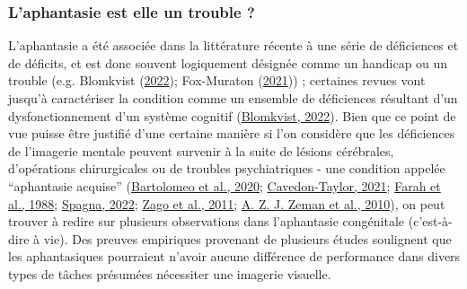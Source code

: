 \documentclass[
  12pt,
]{article}
\begin{document}
\hypertarget{laphantasie-est-elle-un-trouble}{%
\subsubsection{L'aphantasie est elle un trouble
?}\label{laphantasie-est-elle-un-trouble}}

L'aphantasie a été associée dans la littérature récente à une série de
déficiences et de déficits, et est donc souvent logiquement désignée
comme un handicap ou un trouble (e.g. Blomkvist
(\protect\hyperlink{ref-blomkvistAphantasiaSearchTheory2022}{2022});
Fox-Muraton
(\protect\hyperlink{ref-fox-muratonWorldImaginationConsequences2021}{2021}))
; certaines revues vont jusqu'à caractériser la condition comme un
ensemble de déficiences résultant d'un dysfonctionnement d'un système
cognitif
(\protect\hyperlink{ref-blomkvistAphantasiaSearchTheory2022}{Blomkvist,
2022}). Bien que ce point de vue puisse être justifié d'une certaine
manière si l'on considère que les déficiences de l'imagerie mentale
peuvent survenir à la suite de lésions cérébrales, d'opérations
chirurgicales ou de troubles psychiatriques - une condition appelée
``aphantasie acquise''
(\protect\hyperlink{ref-bartolomeoAssessingCausalRole2020}{Bartolomeo et
al., 2020};
\protect\hyperlink{ref-cavedon-taylorPredictiveProcessingPerception2021}{Cavedon-Taylor,
2021}; \protect\hyperlink{ref-farahCaseStudyMental1988}{Farah et al.,
1988}; \protect\hyperlink{ref-spagnaChapterVisualMental2022}{Spagna,
2022}; \protect\hyperlink{ref-zagoCharcotBernardCase2011}{Zago et al.,
2011}; \protect\hyperlink{ref-zemanLossImageryPhenomenology2010}{A. Z.
J. Zeman et al., 2010}), on peut trouver à redire sur plusieurs
observations dans l'aphantasie congénitale (c'est-à-dire à vie). Des
preuves empiriques provenant de plusieurs études soulignent que les
aphantasiques pourraient n'avoir aucune différence de performance dans
divers types de tâches présumées nécessiter une imagerie visuelle.
\end{document}
